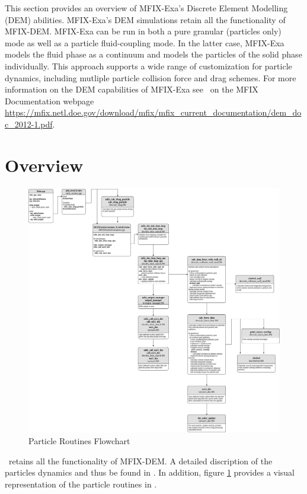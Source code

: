 This section provides an overview of MFIX-Exa's Discrete Element Modelling (DEM)
abilities. MFIX-Exa's DEM simulations retain all the functionality of MFIX-DEM. 
MFIX-Exa can be run in both a pure granular (particles only) mode  
as well as a particle fluid-coupling mode. In the latter case, MFIX-Exa models 
the fluid phase as a continuum and models the
particles of the solid phase individually. This approach supports a wide range 
of customization for particle dynamics, including mutliple particle collision 
force and drag schemes. For more information on the DEM capabilities of MFIX-Exa
see \demdoc\ on the MFIX Documentation webpage 
{\url{https://mfix.netl.doe.gov/download/mfix/mfix_current_documentation/dem_doc_2012-1.pdf}}.

\section{Overview}

\begin{figure}
    \includegraphics[width=\linewidth,natwidth=800, natheight=600]{./Particles/MFIX-Particle-Diagram.png} 
    \caption{Particle Routines Flowchart}
    \label{fig:pflowchart}
\end{figure}

\mfix\ retains all the functionality of MFIX-DEM. A detailed discription of the
particles dynamics and thus be found in \demdoc.
In addition, figure \ref{fig:pflowchart} provides a visual representation
of the particle routines in \mfix. 

